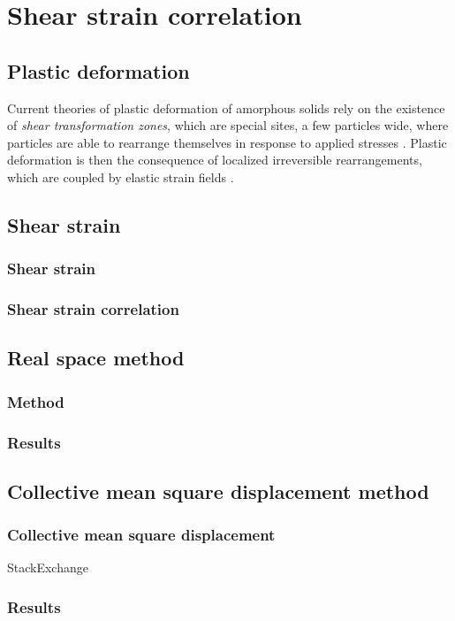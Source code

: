 \documentclass[class=report, float=false, crop=false]{standalone}
\begin{document}
\chapter{Shear strain correlation}
\label{chap:strain}

\section{Plastic deformation}


Current theories of plastic deformation of amorphous solids rely on the existence of \textit{shear transformation zones}, which are special sites, a few particles wide, where particles are able to rearrange themselves in response to applied stresses \cite{falk1998dynamics}. Plastic deformation is then the consequence of localized irreversible rearrangements, which are coupled by elastic strain fields \cite{nicolas2014spatiotemporal}.

\section{Shear strain}

\subsection{Shear strain}

\subsection{Shear strain correlation}

\section{Real space method}

\subsection{Method}

\subsection{Results}

\section{Collective mean square displacement method}

\subsection{Collective mean square displacement}

StackExchange \faStackExchange~ \cite{stackexchange}

\subsection{Results}
\end{document}
